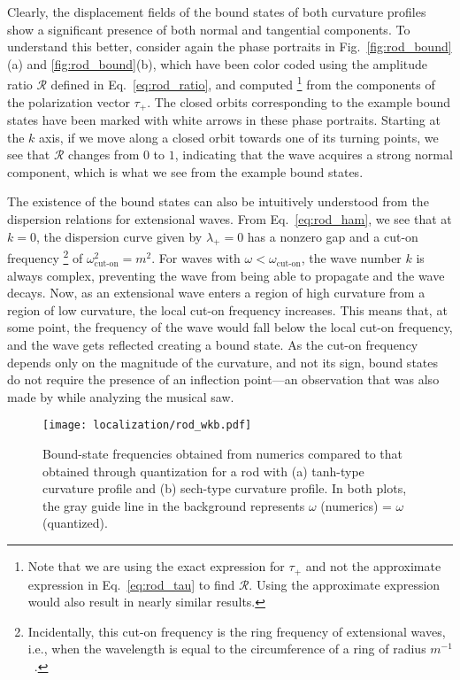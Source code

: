 Clearly, the displacement fields of the bound states of both curvature profiles show a significant presence of both normal and tangential components.
To understand this better, consider again the phase portraits in Fig.~\ref{fig:rod_bound}(a) and \ref{fig:rod_bound}(b), which have been color coded using the amplitude ratio $\mathscr{R}$ defined in Eq.~\eqref{eq:rod_ratio}, and computed%
\footnote{Note that we are using the exact expression for $\tau_{+}$ and not the approximate expression in Eq.~\eqref{eq:rod_tau} to find $\mathscr{R}$.  Using the approximate expression would also result in nearly similar results.}
from the components of the polarization vector $\tau_{+}$.
The closed orbits corresponding to the example bound states have been marked with white arrows in these phase portraits.
Starting at the $k$ axis, if we move along a closed orbit towards one of its turning points, we see that $\mathscr{R}$ changes from $0$ to $1$, indicating that the wave acquires a strong normal component, which is what we see from the example bound states.

The existence of the bound states can also be intuitively understood from the dispersion relations for extensional waves.
From Eq.~\eqref{eq:rod_ham}, we see that at $k = 0$, the dispersion curve given by $\lambda_{+} = 0$ has a nonzero gap and a cut-on frequency%
\footnote{Incidentally, this cut-on frequency is the ring frequency of extensional waves, i.e., when the wavelength is equal to the circumference of a ring of radius $m^{-1}$~\cite{walsh2000}.}
of $\omega_{\text{cut-on}}^{2} = m^{2}$.
For waves with $\omega < \omega_{\text{cut-on}}$, the wave number $k$ is always complex, preventing the wave from being able to propagate and the wave decays.
Now, as an extensional wave enters a region of high curvature from a region of low curvature, the local cut-on frequency increases.
This means that, at some point, the frequency of the wave would fall below the local cut-on frequency, and the wave gets reflected creating a bound state.
As the cut-on frequency depends only on the magnitude of the curvature, and not its sign, bound states do not require the presence of an inflection point---an observation that was also made by \citet{scott1992} while analyzing the musical saw.
%
\begin{figure}
  \begin{center}
    \texttt{[image: localization/rod\_wkb.pdf]}
  \end{center}
  \caption{
    Bound-state frequencies obtained from numerics compared to that obtained through quantization for a rod with (a) tanh-type curvature profile and (b) sech-type curvature profile.
    In both plots, the gray guide line in the background represents $\omega$ (numerics) = $\omega$ (quantized).
  }
  \label{fig:rod_wkb}
\end{figure}

